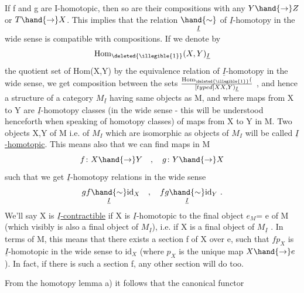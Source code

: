 If f and g are I-homotopic, then so are their compositions with
any $Y \hand{\ensuremath{\to}} Z$ or $T \hand{\ensuremath{\to}} X$. This implies that the relation $\underset{\underline{I}}{\hand{\ensuremath{\sim}}}$ of $\underline{I}$-homotopy
in the wide sense is compatible with compositions. If we denote by
\[ \mathrm{Hom}_{\deleted{\illegible{1}}}(X,Y)_{\underline{I}} \]
the quotient set of Hom(X,Y) by the equivalence relation of $\underline{I}$-homotopy in
the wide sense, we get composition between the sets $\mathrm{Hom}_{\deleted{\illegible{1}}}(\over[typed]{X}{X},Y)_{\underline{I}}$ , and
hence a structure of a category $M_{\underline{I}}$ having same objects as M, and where
maps from X to Y are $\underline{I}$-homotopy classes (in the wide sense - this will
be understood henceforth when speaking of homotopy classes) of maps from
X to Y in M. Two objects X,Y of M i.e. of $M_I$ which are isomorphic as
objects of $M_I$ will be called \uline{$\underline{I}$-homotopic}. This means also that we can
find maps in M 
\[ f\colon X \hand{\ensuremath{\to}} Y \quad , \quad g\colon Y \hand{\ensuremath{\to}} X \]
such that  we get $\underline{I}$-homotopy relations in the wide sense
\[ gf \underset{\underline{I}}{\hand{\ensuremath{\sim}}} \mathrm{id}_X \quad , \quad fg \underset{\underline{I}}{\hand{\ensuremath{\sim}}} \mathrm{id}_Y \ . \]
We'll say X is \uline{$\underline{I}$-contractible} if X is $\underline{I}$-homotopic to the final object $e_M$=
e of M (which visibly is also a final object of $M_{\underline{I}}$), i.e. if X is a
final object of $M_{\underline{I}}$ . In terms of M, this means that there exists a
section f of X over e, such that $fp_X$ is $\underline{I}$-homotopic in the wide sense
to $\mathrm{id}_X$ (where $p_X$ is the unique map $X \hand{\ensuremath{\to}} e$). In fact, if there is such a
section f, any other section will do too.

From the homotopy lemma a) it follows that the canonical functor

